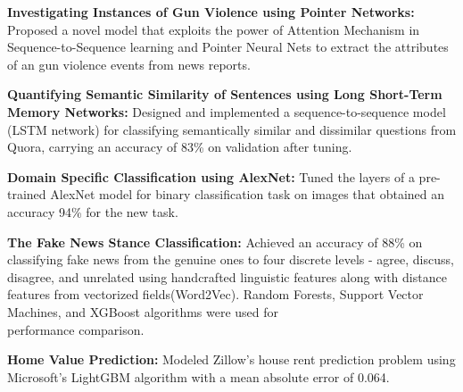\begin{cventries}
\vspace{-5mm}
  \cventry
    {}
    {}
    {}
    {}
    {
      \begin{cvitems}
      \item {{ \textbf{Investigating Instances of Gun Violence using Pointer Networks:} Proposed a novel model that exploits the power of Attention Mechanism in Sequence-to-Sequence learning and Pointer Neural Nets to extract the attributes of an gun violence events from news reports.}}
      \item {{ \textbf{Quantifying Semantic Similarity of Sentences using Long Short-Term Memory Networks:} Designed and implemented a sequence-to-sequence model (LSTM network) for classifying semantically similar and dissimilar questions from Quora, carrying an accuracy of 83\% on validation after tuning.}}
      \item {{\textbf{Domain Specific Classification using AlexNet:} Tuned the layers of a pre-trained AlexNet model for binary classification task on images that obtained an accuracy 94\% for the new task.}}
      \item { \textbf{The Fake News Stance Classification:} Achieved an accuracy of 88\% on classifying fake news from the genuine ones to four discrete levels - agree, discuss, disagree, and unrelated using handcrafted linguistic features along with distance features from vectorized fields(Word2Vec). Random Forests, Support Vector Machines, and XGBoost algorithms were used for \\ performance comparison.}
      \item { \textbf{Home Value Prediction:} Modeled Zillow's house rent prediction problem using Microsoft's LightGBM algorithm with a mean absolute error of 0.064.}
      \end{cvitems}
    }
\end{cventries}
